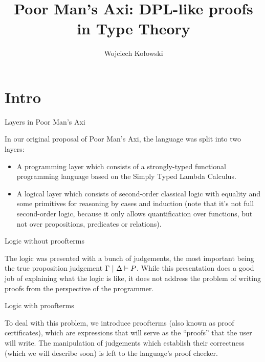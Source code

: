 \documentclass{beamer}
\title{Poor Man's Axi: DPL-like proofs in Type Theory}
\author{Wojciech Kołowski}
\date{}
\begin{document}
\frame{\titlepage}

\section{Intro}

\begin{frame}{Layers in Poor Man's Axi}

In our original proposal of Poor Man's Axi, the language was split into two layers:

\begin{itemize}
  \item A programming layer which consists of a strongly-typed functional programming language based on the Simply Typed Lambda Calculus.
  \item A logical layer which consists of second-order classical logic with equality and some primitives for reasoning by cases and induction (note that it's not full second-order logic, because it only allows quantification over functions, but not over propositions, predicates or relations).
\end{itemize}

\end{frame}

\begin{frame}{Logic without proofterms}

The logic was presented with a bunch of judgements, the most important being the true proposition judgement $\holds{P}$. While this presentation does a good job of explaining what the logic is like, it does not address the problem of writing proofs from the perspective of the programmer.

\end{frame}

\begin{frame}{Logic with proofterms}

To deal with this problem, we introduce proofterms (also known as proof certificates), which are expressions that will serve as the ``proofs'' that the user will write. The manipulation of judgements which establish their correctness (which we will describe soon) is left to the language's proof checker.

\end{frame}
\end{document}
